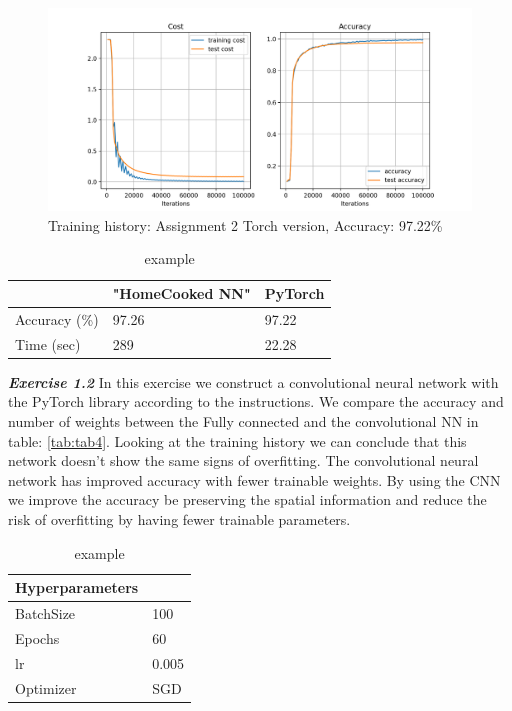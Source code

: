 \documentclass[a4paper,10pt]{article}
\begin{document}
\begin{figure}[ht!]
\centering
\includegraphics[width=120mm]{figures/assignment_3/A2_torchversion.png}
\caption{Training history: Assignment 2 Torch version, Accuracy: 97.22\%}
\label{fig:a2torchver}
\end{figure}


\begin{table}[ht!]
\centering
\begin{tabular}{lll}\hline
 &  \textbf{"HomeCooked NN"}& \textbf{PyTorch} \\ \hline
 Accuracy (\%) &  97.26&  97.22\\
 Time (sec)& 289 & 22.28\\ \hline
\end{tabular}
\caption{example}
\label{tab:tab2}
\end{table}


\newpage

\textit{\textbf{Exercise 1.2}}
In this exercise we construct a convolutional neural network with the PyTorch library according to the instructions. We compare the accuracy and number of weights between the Fully connected and the convolutional NN in table: \ref{tab:tab4}. Looking at the training history we can conclude that this network doesn't show the same signs of overfitting. The convolutional neural network has improved accuracy with fewer trainable weights. By using the CNN we improve the accuracy be preserving the spatial information and reduce the risk of overfitting by having fewer trainable parameters. 

\begin{table}[ht!]
\centering
\begin{tabular}{ll}\hline
 \textbf{Hyperparameters}&    \\ \hline
 BatchSize&  100  \\
 Epochs&  60 \\ 
 lr& 0.005 \\
Optimizer& SGD  \\\hline
\end{tabular}
\caption{example}
\label{tab:tab3}
\end{table}
\end{document}
